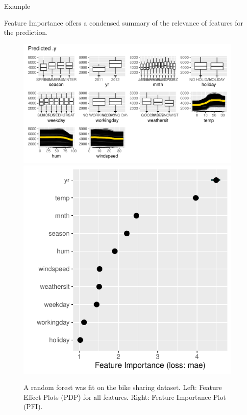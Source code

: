 \documentclass[11pt,compress,t,notes=noshow, xcolor=table]{beamer}
\begin{document}
\begin{vbframe}{Example}

Feature Importance offers a condensed summary of the relevance of features for the prediction.

\begin{center}
  \begin{figure}
  \includegraphics[width=0.6\linewidth]{figure_man/bike_pdp+ice} \hfill \includegraphics[width=0.35\linewidth]{figure_man/bike_pfi}
  \caption{A random forest was fit on the bike sharing dataset. Left: Feature Effect Plots (PDP) for all features. Right: Feature Importance Plot (PFI).}
\end{figure}
\end{center}

\end{vbframe}
\end{document}
